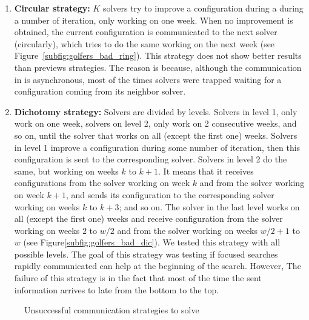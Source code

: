 \begin{enumerate}[label=\Alph*]
\item \textbf{Circular strategy:} $K$ solvers try to improve a configuration during a during a number of iteration, only working on one week. When no improvement is obtained, the current configuration is communicated to the next solver (circularly), which tries to do the same working on the next week (see Figure~\ref{subfig:golfers_bad_ring}).
\subitem This strategy does not show better results than previews strategies. The reason is because, although the communication in \posl{} is asynchronous, most of the times solvers were trapped waiting for a configuration coming from its neighbor solver.

\item \textbf{Dichotomy strategy:} Solvers are divided by levels. Solvers in level 1, only work on one week, solvers on level 2, only work on 2 consecutive weeks, and so on, until the solver that works on all (except the first one) weeks. Solvers in level 1 improve a configuration during some number of iteration, then this configuration is sent to the corresponding solver. Solvers in level 2 do the same, but working on weeks $k$ to $k+1$. It means that it receives configurations from the solver working on week $k$ and from the solver working on week $k+1$, and sends its configuration to the corresponding solver working on weeks $k$ to $k+3$; and so on. The solver in the last level works on all (except the first one) weeks and receive configuration from the solver working on weeks $2$ to $w/2$ and from the solver working on weeks $w/2+1$ to $w$ (see Figure\ref{subfig:golfers_bad_dic}). We tested this strategy with all possible levels. 
\subitem The goal of this strategy was testing if focused searches rapidly communicated can help at the beginning of the search. However, The failure of this strategy is in the fact that most of the time the sent information arrives to late from the bottom to the top.
\end{enumerate}

\begin{figure}[h]
	\centering
	\caption[]{Unsuccessful communication strategies to solve \SGP}
	\label{fig:golfers_bad}
\end{figure}

